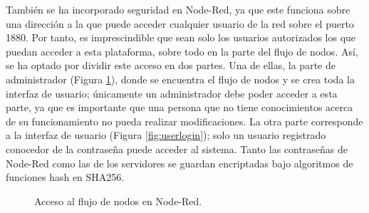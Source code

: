También se ha incorporado seguridad en Node-Red, ya que este funciona sobre una dirección a la que puede acceder cualquier usuario de la red sobre el puerto 1880. Por tanto, es imprescindible que sean solo los usuarios autorizados los que puedan acceder a esta plataforma, sobre todo en la parte del flujo de nodos. Así, se ha optado por dividir este acceso en dos partes. Una de ellas, la parte de administrador (Figura \ref{fig:adminlogin}), donde se encuentra el flujo de nodos y se crea toda la interfaz de usuario; únicamente un administrador debe poder acceder a esta parte, ya que es importante que una persona que no tiene conocimientos acerca de su funcionamiento no pueda realizar modificaciones. La otra parte corresponde a la interfaz de usuario (Figura \ref{fig:userlogin}); solo un usuario registrado conocedor de la contraseña puede acceder al sistema. Tanto las contraseñas de Node-Red como las de los servidores se guardan encriptadas bajo algoritmos de funciones hash en SHA256.\\ 
\begin{figure}[h!]
  \begin{center}
    \hspace{2mm}
  \end{center}
\caption{Acceso al flujo de nodos en Node-Red.} \label{fig:adminlogin}
\end{figure}

